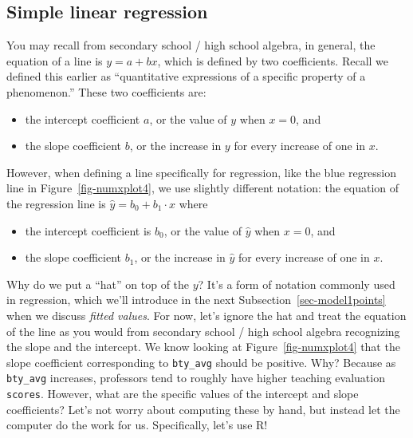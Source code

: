 \documentclass[
  letterpaper,
  DIV=11,
  numbers=noendperiod]{scrreprt}
\providecommand{\tightlist}{%
  \setlength{\itemsep}{0pt}\setlength{\parskip}{0pt}}\usepackage{longtable,booktabs,array}
\theoremstyle{definition}
\theoremstyle{remark}
\begin{document}
\hypertarget{sec-model1table}{%
\subsection{Simple linear regression}\label{sec-model1table}}

You may recall from secondary school / high school algebra, in general,
the equation of a line is \(y = a + bx\), which is defined by two
coefficients. Recall we defined this earlier as ``quantitative
expressions of a specific property of a phenomenon.'' These two
coefficients are:

\begin{itemize}
\tightlist
\item
  the intercept coefficient \(a\), or the value of \(y\) when \(x = 0\),
  and
\item
  the slope coefficient \(b\), or the increase in \(y\) for every
  increase of one in \(x\).
\end{itemize}

However, when defining a line specifically for regression, like the blue
regression line in Figure~\ref{fig-numxplot4}, we use slightly different
notation: the equation of the regression line is
\(\widehat{y} = b_0 + b_1 \cdot x\) where

\begin{itemize}
\tightlist
\item
  the intercept coefficient is \(b_0\), or the value of \(\widehat{y}\)
  when \(x=0\), and
\item
  the slope coefficient \(b_1\), or the increase in \(\widehat{y}\) for
  every increase of one in \(x\).
\end{itemize}

Why do we put a ``hat'' on top of the \(y\)? It's a form of notation
commonly used in regression, which we'll introduce in the next
Subsection~\ref{sec-model1points} when we discuss \emph{fitted values}.
For now, let's ignore the hat and treat the equation of the line as you
would from secondary school / high school algebra recognizing the slope
and the intercept. We know looking at Figure~\ref{fig-numxplot4} that
the slope coefficient corresponding to \texttt{bty\_avg} should be
positive. Why? Because as \texttt{bty\_avg} increases, professors tend
to roughly have higher teaching evaluation \texttt{scores}. However,
what are the specific values of the intercept and slope coefficients?
Let's not worry about computing these by hand, but instead let the
computer do the work for us. Specifically, let's use R!
\end{document}
